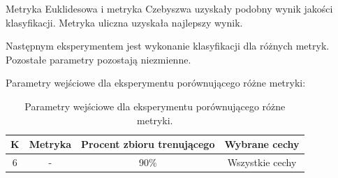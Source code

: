 \documentclass{classrep}
\begin{document}
Metryka Euklidesowa i metryka Czebyszwa uzyskały podobny wynik jakości klasyfikacji. Metryka uliczna uzyskała najlepszy wynik. 


Następnym eksperymentem jest wykonanie klasyfikacji dla różnych metryk. Pozostałe parametry pozostają niezmienne.

Parametry wejściowe dla eksperymentu porównującego różne metryki:
 
\begin{table}[h!]
\caption{Parametry wejściowe dla eksperymentu porównującego różne metryki. }
\centering
\vspace{0.1cm}
 \begin{tabular}{c c c c}
    \textbf{K} & \textbf{Metryka}   & \textbf{Procent zbioru trenującego}  & \textbf{Wybrane cechy}   \\
\hline
6 & - & 90\% &  Wszystkie cechy\\
\end {tabular}
\label {Parametry wejściowe dla eksperymentu porównującego różne metryki. }
\end{table}
\end{document}
